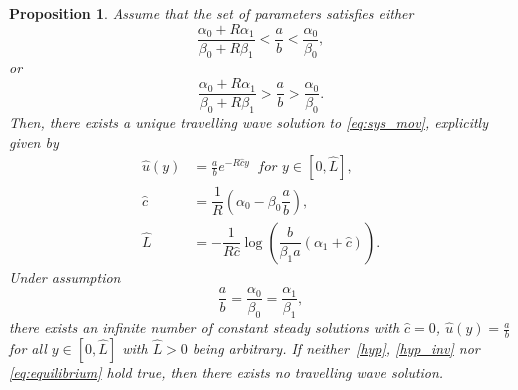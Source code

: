 \documentclass{amsart}
\newtheorem{proposition}[theorem]{Proposition}
\begin{document}
	\begin{proposition} \label{th:trav_wave}
		Assume that the set of parameters satisfies either
		\begin{equation} \label{hyp} 
						\frac{\alpha_0 + R \alpha_1}{\beta_0 + R \beta_1} < \frac{a}{b} < \frac{\alpha_0}{\beta_0},
		\end{equation}
		or 
		\begin{equation} \label{hyp_inv} 
					\frac{\alpha_0 + R \alpha_1}{\beta_0 + R \beta_1} > \frac{a}{b} > \frac{\alpha_0}{\beta_0}.
		\end{equation}
		Then, there exists a unique travelling wave solution to \eqref{eq:sys_mov}, explicitly given by 
		\begin{subequations}\label{eq:tw..}
		\begin{align}
		\label{eq:sol_prog}
			\hat{u}(y) &= \frac{a}{b}e^{-R\hat{c}y } \: \textit{ for } y \in [0, \hat{L}], \\
		\label{eq:tw_velocity}
			\hat{c} & = \dfrac{1}{R}\left(\alpha_0 - \beta_0 \dfrac{a}{b}\right), \\
		\label{eq:tw_size}
			\hat{L} &= - \dfrac{1}{R\hat{c}} \log \left( \dfrac{b}{\beta_1 a} \left( \alpha_1 +\hat{c} \right) \right). 
		\end{align}
		\end{subequations}
		Under assumption 
		\begin{equation}\label{eq:equilibrium}
		 \frac{a}{b} = \frac{\alpha_0}{\beta_0}= \frac{\alpha_1}{\beta_1}, 
		 \end{equation}
		 there exists an infinite number of constant steady solutions with $\hat c = 0$, $\hat u(y) = \frac ab$ for all $y \in [0,\hat L]$ with $\hat L>0$ being arbitrary. 
		 If neither~\eqref{hyp}, \eqref{hyp_inv} nor \eqref{eq:equilibrium} hold true, then there exists no travelling wave solution. 
	\end{proposition}
\end{document}
